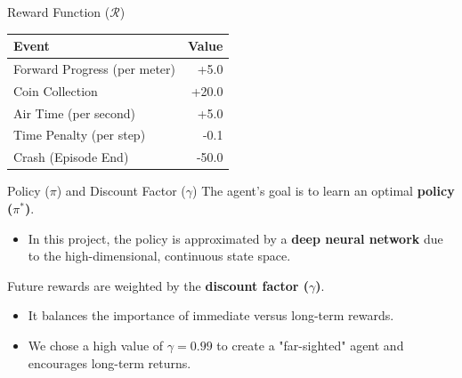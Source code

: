 \documentclass[serif]{beamer}  %
\begin{document}
    \begin{frame}{Reward Function ($\mathcal{R}$)}
        \centering
        \renewcommand{\arraystretch}{1.5}
        \begin{tabular}{l r}
            \toprule
            \textbf{Event} & \textbf{Value} \\
            \midrule
            Forward Progress (per meter) & +5.0 \\
            Coin Collection & +20.0 \\
            Air Time (per second) & +5.0 \\
            Time Penalty (per step) & -0.1 \\
            Crash (Episode End) & -50.0 \\
            \bottomrule
        \end{tabular}
    \end{frame}

    \begin{frame}{Policy ($\pi$) and Discount Factor ($\gamma$)}
     The agent's goal is to learn an optimal \textbf{policy ($\pi^*$)}.
    
    \begin{itemize}
        \item In this project, the policy is approximated by a \textbf{deep neural network} due to the high-dimensional, continuous state space.
    \end{itemize}
        
    Future rewards are weighted by the \textbf{discount factor ($\gamma$)}.
    
    \begin{itemize}
        \item It balances the importance of immediate versus long-term rewards.
        \item We chose a high value of \textbf{$\gamma = 0.99$} to create a "far-sighted" agent and encourages long-term returns.
    \end{itemize}
        
    \end{frame}
\end{document}
